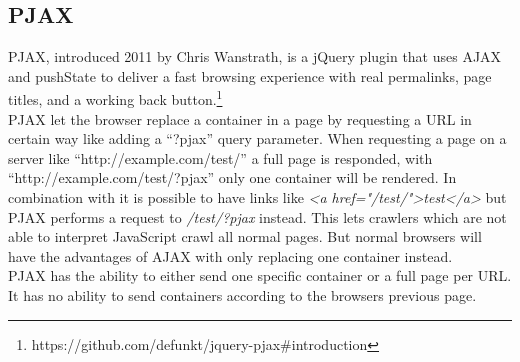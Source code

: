 \subsection{PJAX\label{pjax}}
PJAX, introduced 2011 by Chris Wanstrath, is a jQuery plugin that uses AJAX and pushState to deliver a fast browsing experience with real permalinks, page titles, and a working back button.\footnote{https://github.com/defunkt/jquery-pjax\#introduction}
\\
PJAX let the browser replace a container in a page by requesting a URL in certain way like adding a \enquote{?pjax} query parameter.
When requesting a page on a server like \enquote{http://example.com/test/} a full page is responded, with \enquote{http://example.com/test/?pjax} only one container will be rendered.
In combination with \hijax{} it is possible to have links like \emph{<a href="/test/">test</a>} but PJAX performs a request to \emph{/test/?pjax} instead.
This lets crawlers which are not able to interpret JavaScript crawl all normal pages.
But normal browsers will have the advantages of AJAX with only replacing one container instead.
\\
PJAX has the ability to either send one specific container or a full page per URL. It has no ability to send containers according to the browsers previous page.

